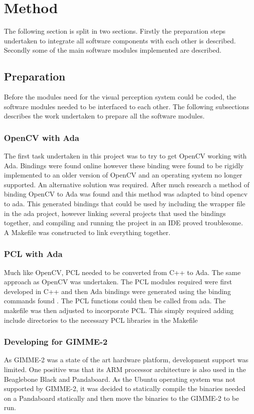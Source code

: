 \section{Method}\label{sec:method}
The following section is split in two sections. Firstly the preparation steps undertaken to integrate all software components with each other is described. Secondly some of the main software modules implemented are described.
\subsection{Preparation}
Before the modules need for the visual perception system could be coded, the software modules needed to be interfaced to each other. The following subsections describes the work undertaken to prepare all the software modules.
\subsubsection{OpenCV with Ada}
The first task undertaken in this project was to try to get OpenCV working with Ada. Bindings were found online \cite{web:oldAdaBindings} however these binding were found to be rigidly implemented to an older version of OpenCV and an operating system no longer supported. An alternative solution was required. After much research a method of binding OpenCV to Ada was found \cite{web:newAdaBindings} and this method was adapted to bind opencv to ada. This generated bindings that could be used by including the wrapper file in the ada project, however linking several projects that used the bindings together, and compiling and running the project in an IDE proved troublesome. A Makefile was constructed to link everything together.

\subsubsection{PCL with Ada}
Much like OpenCV, PCL needed to be converted from C++ to Ada. The same approach as OpenCV was undertaken. The PCL modules required were first developed in C++ and then Ada bindings were generated using the binding commands found \cite{web:newAdaBindings}. The PCL functions could then be called from ada. The makefile was then adjusted to incorporate PCL. This simply required adding include directories to the necessary PCL libraries in the Makefile 

\subsubsection{Developing for GIMME-2}
As GIMME-2 was a state of the art hardware platform, development support was limited. One positive was that its ARM processor architecture is also used in the Beaglebone Black and Pandaboard. As the Ubuntu operating system was not supported by GIMME-2, it was decided to statically compile the binaries needed on a Pandaboard statically and then move the binaries to the GIMME-2 to be run.


